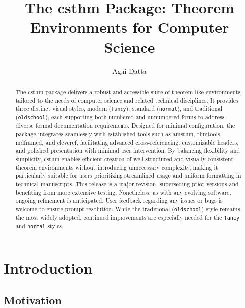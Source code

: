 \documentclass[10pt,letterpaper]{amsart}
\title{The \textsf{csthm} Package: Theorem Environments for Computer Science}
\author{Agni Datta}
\begin{document}
\begin{abstract}
	The \textsf{csthm} package delivers a robust and accessible suite of theorem-like environments tailored to the needs of computer science and related technical disciplines. It provides three distinct visual styles, modern (\texttt{fancy}), standard (\texttt{normal}), and traditional (\texttt{oldschool}), each supporting both numbered and unnumbered forms to address diverse formal documentation requirements. Designed for minimal configuration, the package integrates seamlessly with established tools such as \textsf{amsthm}, \textsf{thmtools}, \textsf{mdframed}, and \textsf{cleveref}, facilitating advanced cross-referencing, customizable headers, and polished presentation with minimal user intervention. By balancing flexibility and simplicity, \textsf{csthm} enables efficient creation of well-structured and visually consistent theorem environments without introducing unnecessary complexity, making it particularly suitable for users prioritizing streamlined usage and uniform formatting in technical manuscripts. This release is a major revision, superseding prior versions and benefiting from more extensive testing. Nonetheless, as with any evolving software, ongoing refinement is anticipated. User feedback regarding any issues or bugs is welcome to ensure prompt resolution. While the traditional (\texttt{oldschool}) style remains the most widely adopted, continued improvements are especially needed for the \texttt{fancy} and \texttt{normal} styles.
\end{abstract}

\maketitle

\clearpage
\tableofcontents
\vfill
\clearpage

\section{Introduction}

\subsection{Motivation}
\end{document}
